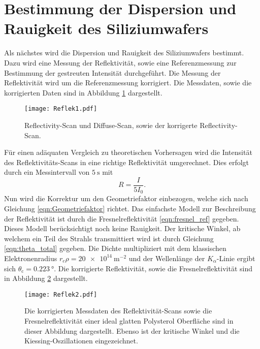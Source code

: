 \section{Bestimmung der Dispersion und Rauigkeit des Siliziumwafers}
\label{sec:dis_rau}
Als nächstes wird die Dispersion und Rauigkeit des Siliziumwafers bestimmt. Dazu wird eine Messung der Reflektivität, sowie eine Referenzmessung zur Bestimmung der gestreuten
Intensität durchgeführt. Die Messung der Reflektivität wird um die Referenzmessung korrigiert. Die Messdaten, sowie die korrigierten Daten sind in Abbildung \ref{fig:Reflek1}
dargestellt.
\begin{figure}
    \centering
    \texttt{[image: Reflek1.pdf]}
    \caption{Reflectivity-Scan und Diffuse-Scan, sowie der korrigerte Reflectivity-Scan.}
    \label{fig:Reflek1}
\end{figure}

Für einen adäquaten Vergleich zu theoretischen Vorhersagen wird die Intensität des Reflektivitäts-Scans in eine richtige Reflektivität umgerechnet. Dies erfolgt durch ein 
Messintervall von $\qty{5}{\second}$ mit 
\begin{equation*}
    R = \frac{I}{5I_0}.
\end{equation*}
Nun wird die Korrektur um den Geometriefaktor einbezogen, welche sich nach Gleichung \ref{eqn:Geometriefaktor} richtet. Das einfachste Modell zur Beschreibung der 
Reflektivität ist durch die Fresnelreflektivität \ref{eqn:fresnel_ref} gegeben. Dieses Modell berücksichtigt noch keine Rauigkeit. Der kritische Winkel, ab welchem ein Teil des
Strahls transmittiert wird ist durch Gleichung \ref{eqn:theta_total} gegeben. Die Dichte multipliziert mit dem klassischen Elektronenradius $r_e\rho = \qty{20e14}{\metre^{-2}}$ \cite{V44} und der Wellenlänge 
der $K_\alpha$-Linie ergibt sich $\theta_\text{c} = \qty{0.223}{\degree}$. Die korrigierte Reflektivität, sowie die Fresnelreflektivität sind in Abbildung \ref{fig:Reflek2}
dargestellt.

\begin{figure}
    \centering
    \texttt{[image: Reflek2.pdf]}
    \caption{Die korrigierten Messdaten des Reflektivität-Scans sowie die Fresnelreflektivität einer 
    ideal glatten Polysterol Oberfläche sind in dieser Abbildung dargestellt. Ebenso ist der kritische Winkel und die Kiessing-Oszillationen eingezeichnet.}
    \label{fig:Reflek2}
\end{figure}

